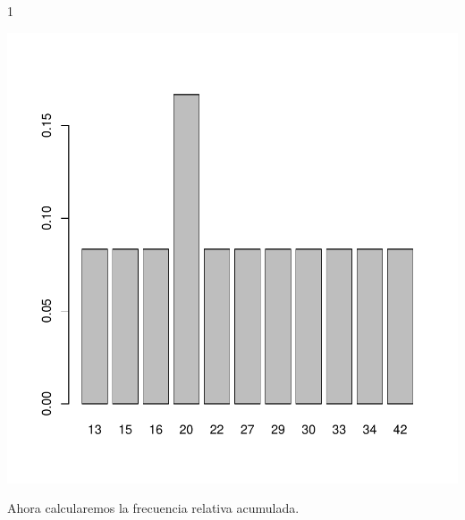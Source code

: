 \documentclass [a4paper] {article}
\begin{document}
\begin{Schunk}
\begin{Soutput}
[1] 1
\end{Soutput}
\end{Schunk}
\begin{center}
\includegraphics{entrega-frecuencia_relativa_satelites_plot}
\end{center}

Ahora calcularemos la frecuencia relativa acumulada.
\end{document}

